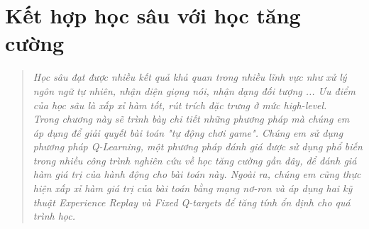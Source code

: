 \chapter{Kết hợp học sâu với học tăng cường}
\begin{quote}
\textit{Học sâu đạt được nhiều kết quả khả quan trong nhiều lĩnh vực như xử lý ngôn ngữ tự nhiên, nhận diện giọng nói, nhận dạng đối tượng ... Ưu điểm của học sâu là xấp xỉ hàm tốt, rút trích đặc trưng ở mức high-level. \\
Trong chương này sẽ trình bày chi tiết những phương pháp mà chúng em áp dụng để giải quyết bài toán "tự động chơi game". Chúng em sử dụng phương pháp Q-Learning, một phương pháp đánh giá được sử dụng phổ biến trong nhiều công trình nghiên cứu về học tăng cường gần đây, để đánh giá hàm giá trị của hành động cho bài toán này. Ngoài ra, chúng em cũng thực hiện xấp xỉ hàm giá trị của bài toán bằng mạng nơ-ron và áp dụng hai kỹ thuật Experience Replay và Fixed Q-targets để tăng tính ổn định cho quá trình học.}
\end{quote}
%
%	
%	
%	
	